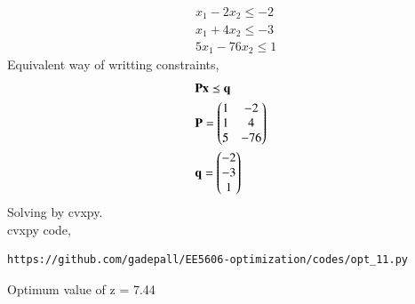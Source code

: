 \documentclass[journal,12pt,twocolumn]{IEEEtran}
\begin{document}
\begin{enumerate}
\begin{align}
&x_1-2x_2\leq -2\\
&x_1+4x_2\leq -3  \\
&5x_1 -76 x_2 \leq 1
\end{align}
Equivalent way of writting constraints,
\begin{align}
&\mathbf{Px} \preceq \mathbf{q}\\
&\mathbf{P}=\begin{pmatrix}1&-2\\1&4\\5&-76\end{pmatrix}\\
&\mathbf{q}=\begin{pmatrix}-2\\-3\\1\end{pmatrix}
\end{align}
Solving by cvxpy.\\
cvxpy code,
\begin{lstlisting}
https://github.com/gadepall/EE5606-optimization/codes/opt_11.py
\end{lstlisting} 
Optimum value of z = 7.44
\end{enumerate}
\end{document}
